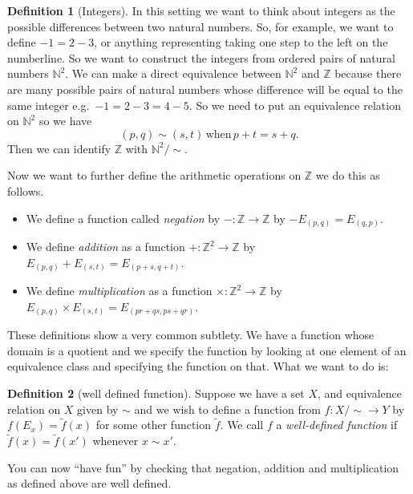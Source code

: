 \documentclass[
]{book}
\theoremstyle{definition}
\newtheorem{definition}{Definition}[chapter]
\theoremstyle{definition}
\theoremstyle{definition}
\theoremstyle{definition}
\theoremstyle{remark}
\begin{document}
\begin{definition}[Integers]

In this setting we want to think about integers as the possible differences between two natural numbers. So, for example, we want to define \(-1 = 2-3\), or anything representing taking one step to the left on the numberline. So we want to construct the integers from ordered pairs of natural numbers \(\mathbb{N}^2\). We can make a direct equivalence between \(\mathbb{N}^2\) and \(\mathbb{Z}\) because there are many possible pairs of natural numbers whose difference will be equal to the same integer e.g.~\(-1=2-3=4-5\). So we need to put an equivalence relation on \(\mathbb{N}^2\) so we have
\[ (p, q) \sim (s,t) \, \mbox{when} \, p+t=s+q.  \]
Then we can identify \(\mathbb{Z}\) with \(\mathbb{N}^2/\sim\).

Now we want to further define the arithmetic operations on \(\mathbb{Z}\) we do this as follows.

\begin{itemize}
\item
  We define a function called \emph{negation} by \(-:\mathbb{Z} \rightarrow \mathbb{Z}\) by \(-E_{(p,q)} = E_{(q,p)}\).
\item
  We define \emph{addition} as a function \(+: \mathbb{Z}^2 \rightarrow \mathbb{Z}\) by \(E_{(p,q)} + E_{(s,t)} = E_{(p+s, q+t)}\).
\item
  We define \emph{multiplication} as a function \(\times : \mathbb{Z}^2 \rightarrow \mathbb{Z}\) by \(E_{(p,q)} \times E_{(s,t)} = E_{(pr+qs, ps+qr)}\).
\end{itemize}

\end{definition}

These definitions show a very common subtlety. We have a function whose domain is a quotient and we specify the function by looking at one element of an equivalence class and specifying the function on that. What we want to do is:

\begin{definition}[well defined function]
Suppose we have a set \(X\), and equivalence relation on \(X\) given by \(\sim\) and we wish to define a function from \(f: X/\sim \rightarrow Y\) by \(f(E_x) = \tilde{f}(x)\) for some other function \(\tilde{f}\). We call \(f\) a \emph{well-defined function} if \(\tilde{f}(x) = \tilde{f}(x')\) whenever \(x \sim x'\).
\end{definition}

You can now ``have fun'' by checking that negation, addition and multiplication as defined above are well defined.
\end{document}
